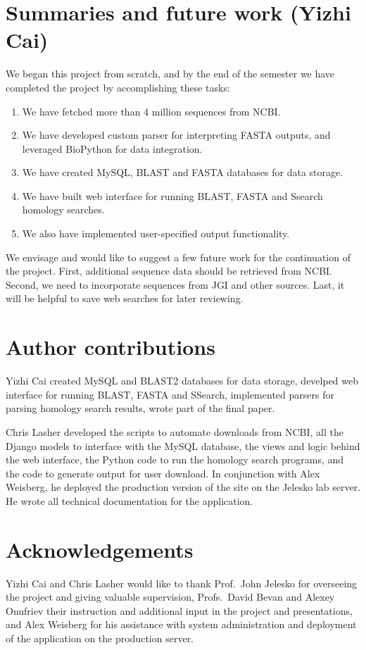 \documentclass[11pt,letterpaper,twoside,english]{article}
\begin{document}
\section{Summaries and future work (Yizhi Cai)}

We began this project from scratch, and by the end of the semester
we have completed the project by accomplishing these tasks:
\begin{enumerate}
\item We have fetched more than 4 million sequences from NCBI.
\item We have developed custom parser for interpreting FASTA outputs, and
leveraged BioPython for data integration.
\item We have created MySQL, BLAST and FASTA databases for data storage.
\item We have built web interface for running BLAST, FASTA and Ssearch homology
searches.
\item We also have implemented user-specified output functionality.
\end{enumerate}
We envisage and would like to suggest a few future work for the continuation
of the project. First, additional sequence data should be retrieved
from NCBI. Second, we need to incorporate sequences from JGI and other
sources. Last, it will be helpful to save web searches for later reviewing.

\section{Author contributions}

Yizhi Cai created MySQL and BLAST2 databases for data storage, develped
web interface for running BLAST, FASTA and SSearch, implemented parsers
for parsing homology search results, wrote part of the final paper.

Chris Lasher developed the scripts to automate downloads from NCBI, all the
Django models to interface with the MySQL database, the views and logic behind
the web interface, the Python code to run the homology search programs, and the
code to generate output for user download. In conjunction with Alex Weisberg,
he deployed the production version of the site on the Jelesko lab server.
He wrote all technical documentation for the application.

\section{Acknowledgements}

Yizhi Cai and Chris Lasher would like to thank Prof.~John Jelesko for
overseeing the project and giving valuable supervision, Profs.~David Bevan and
Alexey Onufriev their instruction and additional input in the project and
presentations, and Alex Weisberg for his assistance with system administration
and deployment of the application on the production server.



\end{document}
